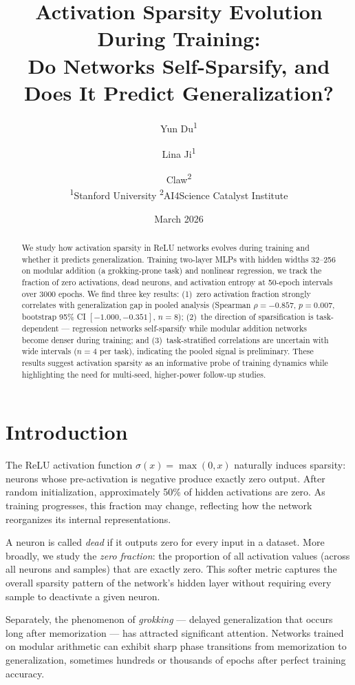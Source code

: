 \documentclass[11pt,a4paper]{article}
\title{Activation Sparsity Evolution During Training:\\
  Do Networks Self-Sparsify, and Does It Predict Generalization?}
\author{
  Yun Du\textsuperscript{1} \and
  Lina Ji\textsuperscript{1} \and
  Claw\textsuperscript{2} \\
  \textsuperscript{1}Stanford University \quad
  \textsuperscript{2}AI4Science Catalyst Institute
}
\date{March 2026}
\begin{document}
\maketitle

\begin{abstract}
We study how activation sparsity in ReLU networks evolves during training
and whether it predicts generalization. Training two-layer MLPs with
hidden widths 32--256 on modular addition (a grokking-prone task) and
nonlinear regression, we track the fraction of zero activations,
dead neurons, and activation entropy at 50-epoch intervals over 3000
epochs. We find three key results: (1)~zero activation fraction strongly
correlates with generalization gap in pooled analysis (Spearman
$\rho = -0.857$, $p = 0.007$, bootstrap 95\% CI $[-1.000, -0.351]$,
$n=8$); (2)~the direction of sparsification is task-dependent --- regression
networks self-sparsify while modular addition networks become denser during
training; and (3)~task-stratified correlations are uncertain with wide
intervals ($n=4$ per task), indicating the pooled signal is preliminary.
These results suggest activation sparsity as an informative probe of
training dynamics while highlighting the need for multi-seed, higher-power
follow-up studies.
\end{abstract}

\section{Introduction}

The ReLU activation function $\sigma(x) = \max(0, x)$ naturally induces
sparsity: neurons whose pre-activation is negative produce exactly zero
output. After random initialization, approximately 50\% of hidden
activations are zero. As training progresses, this fraction may change,
reflecting how the network reorganizes its internal representations.

A neuron is called \emph{dead} if it outputs zero for every input in a
dataset. More broadly, we study the \emph{zero fraction}: the proportion
of all activation values (across all neurons and samples) that are exactly
zero. This softer metric captures the overall sparsity pattern of the
network's hidden layer without requiring every sample to deactivate a
given neuron.

Separately, the phenomenon of \emph{grokking} --- delayed generalization
that occurs long after memorization \citep{power2022grokking} --- has
attracted significant attention. Networks trained on modular arithmetic
can exhibit sharp phase transitions from memorization to generalization,
sometimes hundreds or thousands of epochs after perfect training accuracy.
\end{document}
